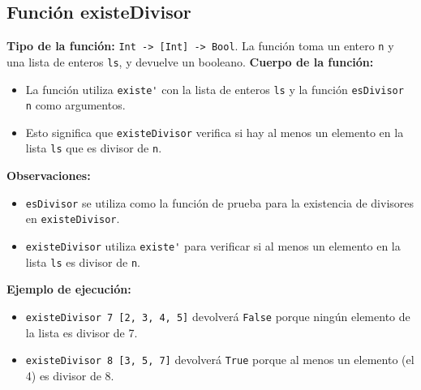 \documentclass{article}
\begin{document}
\begin{itemize}
\subsection*{Función existeDivisor}
\textbf{Tipo de la función:} \verb|Int -> [Int] -> Bool|. La función toma un entero \verb|n| y una lista de enteros \verb|ls|, y devuelve un booleano.
\textbf{Cuerpo de la función:}
\begin{itemize}
\item La función utiliza \verb|existe'| con la lista de enteros \verb|ls| y la función \verb|esDivisor n| como argumentos.
\item Esto significa que \verb|existeDivisor| verifica si hay al menos un elemento en la lista \verb|ls| que es divisor de \verb|n|.
\end{itemize}
\textbf{Observaciones:}
\begin{itemize}
\item \verb|esDivisor| se utiliza como la función de prueba para la existencia de divisores en \verb|existeDivisor|.
\item \verb|existeDivisor| utiliza \verb|existe'| para verificar si al menos un elemento en la lista \verb|ls| es divisor de \verb|n|.
\end{itemize}
\textbf{Ejemplo de ejecución:}
\begin{itemize}
\item \verb|existeDivisor 7 [2, 3, 4, 5]| devolverá \verb|False| porque ningún elemento de la lista es divisor de 7.
\item \verb|existeDivisor 8 [3, 5, 7]| devolverá \verb|True| porque al menos un elemento (el 4) es divisor de 8.
\end{itemize}


\end{itemize}
\end{document}
